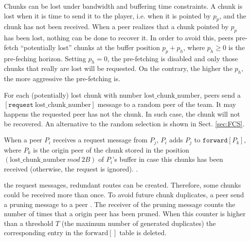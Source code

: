 

\label{sec:routes_discovery}

Chunks can be lost under bandwidth and buffering time constraints. A
chunk is lost when it is time to send it to the player, i.e. when it
is pointed by $p_p$, and the chunk has not been received.  When a peer
realizes that a chunk pointed by $p_p$ has been lost, nothing can be
done to recover it. In order to avoid this, peers pre-fetch
``potentially lost'' chunks at the buffer position $p_p+p_h$, where
$p_h\geq 0$ is the pre-feching horizon. Setting $p_h=0$, the
pre-fetching is disabled and only those chunks that really are lost
will be requested.  On the contrary, the higher the $p_h$, the more
aggressive the pre-fetching is.


For each (potentially) lost chunk with number
$\text{lost\_chunk\_number}$, peers send a
$[\mathtt{request}~\text{lost\_chunk\_number}]$ message to a random
peer of the team. It may happens the requested peer has not the
chunk. In such case, the chunk will not be recovered. An alternative
to the random selection is shown in Sect. \ref{sec:FCS}.

When a peer $P_i$ receives a request message from $P_j$, $P_i$ adds
$P_j$ to $\mathtt{forward}[P_k]$, where $P_k$ is the origin peer of
the chunk stored in the position
$(\text{lost\_chunk\_number}~\mathit{mod}~2B)$ of $P_i$'s buffer in
case this chunks has been received (otherwise, the request is
ignored). .

 the request messages, redundant routes can be created. Therefore, some chunks could be received more than once. To avoid future chunk duplicates, a peer send a pruning message to a peer . The receiver of the pruning message counts the number of times that a origin peer has
been  pruned. When this counter is higher than a threshold $T$ (the
maximum number of generated duplicates) the corresponding entry in the $\text{forward}[]$ table is deleted.

